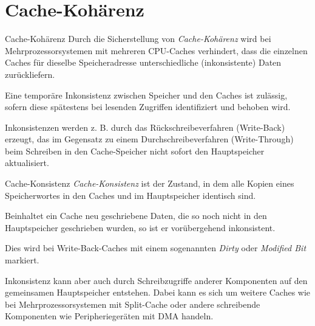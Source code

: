 
\section{Cache-Kohärenz}

\begin{defi}{Cache-Kohärenz}
    Durch die Sicherstellung von \emph{Cache-Kohärenz} wird bei Mehrprozessorsystemen mit mehreren CPU-Caches verhindert, dass die einzelnen Caches für dieselbe Speicheradresse unterschiedliche (inkonsistente) Daten zurückliefern.

    Eine temporäre Inkonsistenz zwischen Speicher und den Caches ist zulässig, sofern diese spätestens bei lesenden Zugriffen identifiziert und behoben wird.

    Inkonsistenzen werden z. B. durch das Rückschreibeverfahren (Write-Back) erzeugt, das im Gegensatz zu einem Durchschreibeverfahren (Write-Through) beim Schreiben in den Cache-Speicher nicht sofort den Hauptspeicher aktualisiert.
\end{defi}

\begin{defi}{Cache-Konsistenz}
    \emph{Cache-Konsistenz} ist der Zustand, in dem alle Kopien eines Speicherwortes in den Caches und im Hauptspeicher identisch sind.

    Beinhaltet ein Cache neu geschriebene Daten, die so noch nicht in den Hauptspeicher geschrieben wurden, so ist er vorübergehend inkonsistent.

    Dies wird bei Write-Back-Caches mit einem sogenannten \emph{Dirty} oder \emph{Modified Bit} markiert.

    Inkonsistenz kann aber auch durch Schreibzugriffe anderer Komponenten auf den gemeinsamen Hauptspeicher entstehen.
    Dabei kann es sich um weitere Caches wie bei Mehrprozessorsystemen mit Split-Cache oder andere schreibende Komponenten wie Peripheriegeräten mit DMA handeln.
\end{defi}

